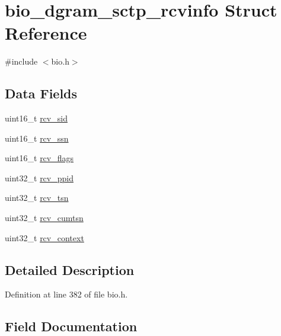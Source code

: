 \hypertarget{structbio__dgram__sctp__rcvinfo}{}\section{bio\+\_\+dgram\+\_\+sctp\+\_\+rcvinfo Struct Reference}
\label{structbio__dgram__sctp__rcvinfo}


{\ttfamily \#include $<$bio.\+h$>$}

\subsection*{Data Fields}
\begin{DoxyCompactItemize}
\item 
uint16\+\_\+t \hyperlink{structbio__dgram__sctp__rcvinfo_ad99149721b33ac72e435709c660570d6}{rcv\+\_\+sid}
\item 
uint16\+\_\+t \hyperlink{structbio__dgram__sctp__rcvinfo_a96a0bf7b20ec2e04ceae54eba07b949e}{rcv\+\_\+ssn}
\item 
uint16\+\_\+t \hyperlink{structbio__dgram__sctp__rcvinfo_adb00789de0d42ad17db4dc287fb41169}{rcv\+\_\+flags}
\item 
uint32\+\_\+t \hyperlink{structbio__dgram__sctp__rcvinfo_a5ecdfd6e440b2f0b1ee431c91e9700e7}{rcv\+\_\+ppid}
\item 
uint32\+\_\+t \hyperlink{structbio__dgram__sctp__rcvinfo_a6b9658186c2748c608e574964973b5c3}{rcv\+\_\+tsn}
\item 
uint32\+\_\+t \hyperlink{structbio__dgram__sctp__rcvinfo_a49ad4bcb580925ed99be7f5973e893cd}{rcv\+\_\+cumtsn}
\item 
uint32\+\_\+t \hyperlink{structbio__dgram__sctp__rcvinfo_a08555da40f69f4dbd029036f729686d1}{rcv\+\_\+context}
\end{DoxyCompactItemize}


\subsection{Detailed Description}


Definition at line 382 of file bio.\+h.



\subsection{Field Documentation}
